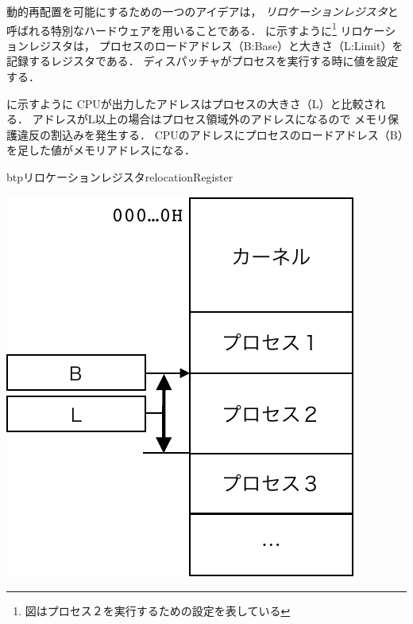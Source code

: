 動的再配置を可能にするための一つのアイデアは，
\emph{リロケーションレジスタ}と呼ばれる特別なハードウェアを用いることである．
に示すように\footnote{
  図はプロセス２を実行するための設定を表している}
リロケーションレジスタは，
プロセスのロードアドレス（B:Base）と大きさ（L:Limit）を記録するレジスタである．
ディスパッチャがプロセスを実行する時に値を設定する．

に示すように
CPUが出力したアドレスはプロセスの大きさ（L）と比較される．
アドレスがL以上の場合はプロセス領域外のアドレスになるので
メモリ保護違反の割込みを発生する．
CPUのアドレスにプロセスのロードアドレス（B）を足した値がメモリアドレスになる．

\begin{myfig}{btp}{リロケーションレジスタ}{relocationRegister}
  \begin{minipage}{0.49\columnwidth}
    \begin{center}
      \includegraphics[scale=0.6]{Fig/relocationAddrSpace-crop.pdf}
      \label{fig:relocationAddrSpace}
    \end{center}
  \end{minipage}
  \begin{minipage}{0.49\columnwidth}
    \begin{center}

\end{center}
\end{minipage}
\end{myfig}
